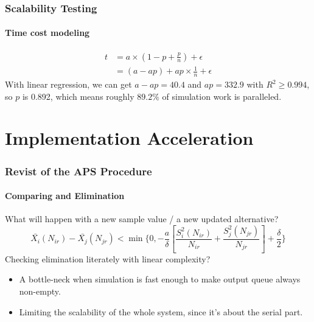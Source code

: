 \documentclass{beamer}
\begin{document}
\begin{frame}
\frametitle{Scalability Testing}
\framesubtitle{Time cost modeling}
\begin{align*}
t & = a \times (1 - p + \frac{p}{n}) + \epsilon \\
& = (a - ap) + ap \times \frac{1}{n} + \epsilon
\end{align*}
With linear regression, we can get $a - ap = 40.4$ and $ap = 332.9$ with $R^2 \geqslant 0.994$, so $p$ is 0.892, which means roughly $89.2\%$ of simulation work is paralleled.
\end{frame}

\section{Implementation Acceleration}

\begin{frame}
\frametitle{Revist of the APS Procedure}
\framesubtitle{Comparing and Elimination}
What will happen with a new sample value / a new updated alternative?
$$ \bar{X_{i}}(N_{ir}) - \bar{X_{j}}(N_{jr}) < \min\{0, -\frac{a}{\delta}[\frac{S_i^2(N_{ir})}{N_{ir}} + \frac{S_j^2(N_{jr})}{N_{jr}}] + \frac{\delta}{2}\} $$
Checking elimination literately with linear complexity?
\begin{itemize}
\item A bottle-neck when simulation is fast enough to make output queue always non-empty.
\item Limiting the scalability of the whole system, since it's about the serial part.
\end{itemize}
\end{frame}
\end{document}
